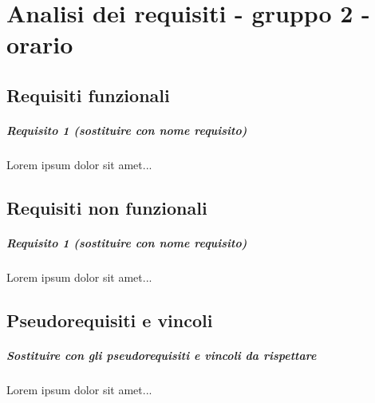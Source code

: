 
\chapter{Analisi dei requisiti - gruppo 2 - orario}
\label{ref:requisiti2-orario}


\section{Requisiti funzionali}

\paragraph{Requisito 1 (sostituire con nome requisito) \\} 
Lorem ipsum dolor sit amet...

\section{Requisiti non funzionali}

\paragraph{Requisito 1 (sostituire con nome requisito) \\} 
Lorem ipsum dolor sit amet...

\section{Pseudorequisiti e vincoli}
\paragraph{Sostituire con gli pseudorequisiti e vincoli da rispettare \\}
Lorem ipsum dolor sit amet...

\clearpage
